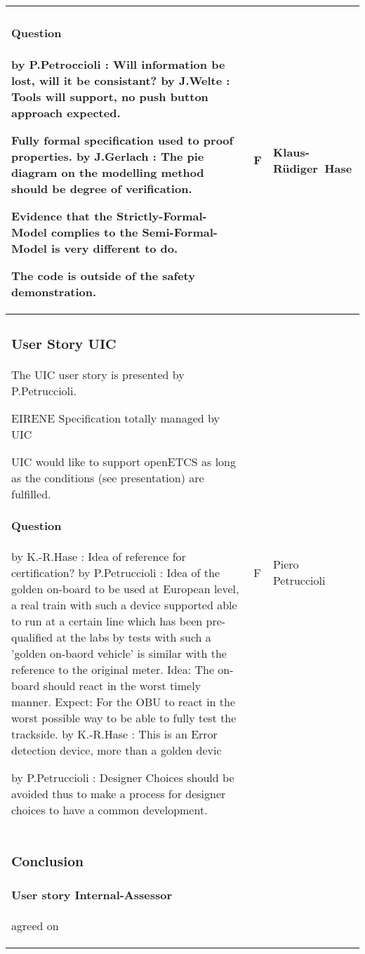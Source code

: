 \documentclass[a4paper]{article}
\newcommand{\Q}[2]{\paragraph{Question} 
	\ifthenelse{\isempty{#1}}%
    	{}%
    	{by #1}%
    : #2}
\newcommand{\A}[2]{\newline{\textbf{Answer}}
	\ifthenelse{\isempty{#1}}%
    	{}%
    	{by #1}%
    : #2}
\newcommand{\C}[2]{\newline{\textbf{Comment}}
	\ifthenelse{\isempty{#1}}%
    	{}%
    	{by #1}%
    : #2}
\begin{document}
\begin{longtable}{|p{}|p{}|p{}|}
\Q{P.Petroccioli}{Will information be lost, will it be consistant?}
\A{J.Welte}{Tools will support, no push button approach expected.} 


Fully formal specification used to proof properties. \newline
\newline
\C{J.Gerlach} The pie diagram on the modelling method should be degree of verification. \newline

Evidence that the Strictly-Formal-Model complies to the Semi-Formal-Model is very different to do. \newline

The code is outside of the safety demonstration.

& F
& Klaus-R\"{u}diger\ Hase
\\\hline
\setcounter{subsubsection}{3}
\subsubsection {User Story UIC} %
The UIC user story is presented by P.Petruccioli.

EIRENE Specification totally managed by UIC

UIC would like to support openETCS as long as the conditions (see presentation) are fulfilled.

\Q{K.-R.Hase}{Idea of reference for certification?}
\A{P.Petruccioli}{Idea of the golden on-board to be used at European level, a real train with such a device supported able to run at a certain line which has been pre-qualified at the labs by tests with such a 'golden on-baord vehicle' is similar with the reference to the original meter. Idea: The on-board should react in the worst timely manner. 
Expect: For the OBU to react in the worst possible way to be able to fully test the trackside.}
\A{K.-R.Hase}{This is an Error detection device, more than a golden devic}

\C{P.Petruccioli}{Designer Choices should be avoided thus to make a process for designer choices to have a common development.}

& F
& Piero Petruccioli 
\\\hline
\setcounter{subsubsection}{5}
\subsubsection {Conclusion} %

\paragraph{User story Internal-Assessor} agreed on


\end{longtable}
\end{document}
